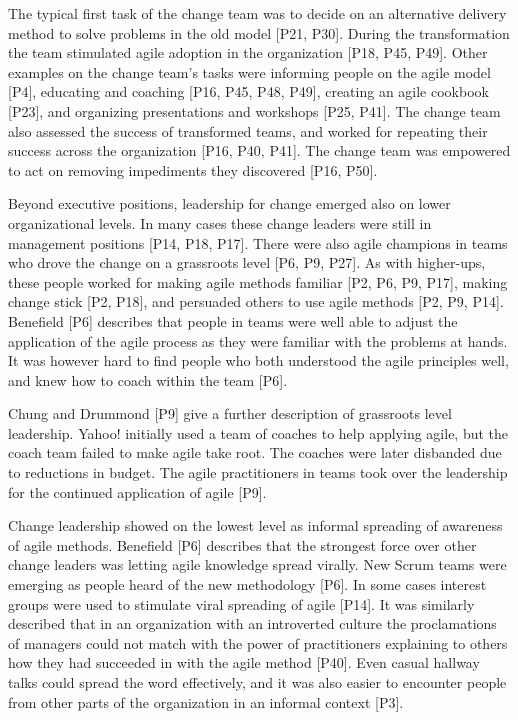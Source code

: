 The typical first task of the change team was to decide on an alternative
delivery method to solve problems in the old model [P21, P30]. During the
transformation the team stimulated agile adoption in the organization [P18, P45,
P49]. Other examples on the change team's tasks were informing people on the
agile model [P4], educating and coaching [P16, P45, P48, P49], creating an agile
cookbook [P23], and organizing presentations and workshops [P25, P41]. The
change team also assessed the success of transformed teams, and worked for
repeating their success across the organization [P16, P40, P41]. The change team
was empowered to act on removing impediments they discovered [P16, P50].


Beyond executive positions, leadership for change emerged also on lower
organizational levels. In many cases these change leaders were still in
management positions [P14, P18, P17]. There were also agile champions in teams
who drove the change on a grassroots level [P6, P9, P27].
As with higher-ups, these people worked for making agile methods familiar [P2,
P6, P9, P17], making change stick [P2, P18], and persuaded others to use agile
methods [P2, P9, P14].
Benefield [P6] describes that people in teams were well able to adjust the
application of the agile process as they were familiar with the problems at
hands. It was however hard to find people who both understood the agile
principles well, and knew how to coach within the team [P6].

Chung and Drummond [P9] give a further description of grassroots level
leadership. Yahoo! initially used a team of coaches to help applying agile, but
the coach team failed to make agile take root. The coaches were later disbanded
due to reductions in budget. The agile practitioners in teams took over the
leadership for the continued application of agile [P9].


Change leadership showed on the lowest level as informal spreading of awareness
of agile methods.
Benefield [P6] describes that the strongest force over other change leaders was
letting agile knowledge spread virally. New Scrum teams were emerging as people
heard of the new methodology [P6]. In some cases interest groups were used to
stimulate viral spreading of agile [P14].
It was similarly described that in an organization with an introverted culture
the proclamations of managers could not match with the power of practitioners
explaining to others how they had succeeded in with the agile method [P40].
Even casual hallway talks could spread the word effectively, and it was also
easier to encounter people from other parts of the organization in an informal
context [P3].


